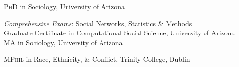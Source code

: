 \textsc{PhD} in Sociology, University of Arizona \\
\begin{comment}
    \emph{Dissertation Title}: “”\\
    \emph{Committee}:  \\
\end{comment}
\emph{Comprehensive Exams}: Social Networks, Statistics \& Methods\\

Graduate Certificate in Computational Social Science, University of Arizona \\

\textsc{MA} in Sociology, University of Arizona \\
\begin{comment}
    \emph{Thesis}: “The Importance of Homophily for Perceived Ethno-Racial Discrimination”\\
    \emph{Committee}: Daniel E. Martínez (Chair), Joseph Galaskiewicz, Jeremy E. Fiel\\ 
\end{comment}

\textsc{MPhil} in Race, Ethnicity, \& Conflict, Trinity College, Dublin\\
\begin{comment}
\emph{Thesis}: “Teaching Locality: A Comparative Analysis of The Promotion of Local
Culture in Postcolonial State Curricula”\\
\emph{Advisor}: Daniel Faas \\
\end{comment}




\begin{comment}

2017 PhD Sociology - University of Arizona
2017 PhD Sociology - University of Utah
2017 PhD Sociology - University of New Mexico
2017 PhD Sociology - Washington State University 
2016 PhD Sociology - Trinity College Dublin
2014 MS International Development (Conflict, Security and Development) -
    University of  Birmingham
2014 MS Peace, Conflict and Development - University of Bradford
2013 Master's Conflict Resolution and Governance - University of Amsterdam
2013 MA Dispute Resolution - Southern Methodist University 
2013 MSc Conflict Resolution - Portland State University
2011 BA - University of Utah
2011 BA - Brigham Young University - Hawaii 
2011 BA - Brigham Young University - Idaho 

2017 PhD Sociology - University of Hawaii
2017 PhD Education, Culture and Society - University of Utah
2017 PhD Sociology - University of California - Santa Cruz
2017 PhD Sociology - Notre Dame 
2017 Teach for America
2014 MA in Politics and Public Administration & Conflict Management - 
    Universität Konstanz 
2014 MA International Development: Poverty, Conflict and Reconstruction
    University of Manchester 
2011 BA - Brigham Young University 

\end{comment}